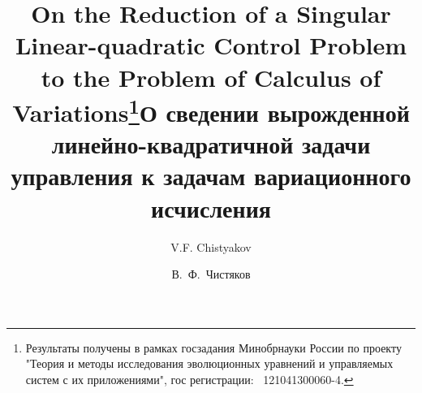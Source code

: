 \begin{englishtitle}
\title{On the Reduction of a Singular Linear-quadratic 
	Control Problem to the Problem of Calculus of Variations\thanks{Результаты получены в рамках госзадания Минобрнауки России по проекту "Теория и методы исследования эволюционных уравнений и управляемых систем с их приложениями", \textnumero гос регистрации: ~121041300060-4.}}
\author{V.F. Chistyakov}

\maketitle

\begin{abstract}

\end{abstract}
\end{englishtitle}

\iffalse


\documentclass[12pt]{llncs}
\usepackage[T2A]{fontenc}
\usepackage[utf8]{inputenc}
\usepackage[english,russian]{babel}
\usepackage[russian]{nla}




\fi

\title{О сведении вырожденной линейно-квадратичной задачи управления к задачам вариационного исчисления}
\author{В.~Ф.~Чистяков
} %

\maketitle



